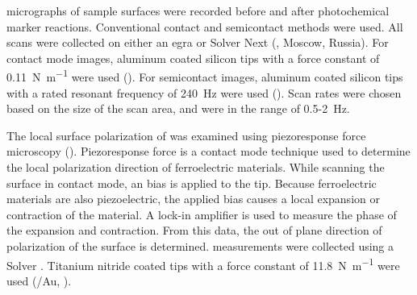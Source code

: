  micrographs of sample surfaces were recorded before and after photochemical
marker reactions. Conventional contact and semicontact methods were
used.\cite{Anonymous:YBI-TQ6H} All scans were collected on either an egra or
Solver Next  (, Moscow, Russia). For contact mode images, aluminum
coated silicon tips with a force constant of 0.11~\si{\newton\per\meter} were used
(). For semicontact images, aluminum coated silicon tips with a rated
resonant frequency of 240~\si{\hertz} were used (). Scan rates were
chosen based on the size of the scan area, and were in the range of 0.5-2~\si{\hertz}.  

The local surface polarization of  was examined using piezoresponse force
microscopy (). Piezoresponse force is a contact mode technique used to determine
the local polarization direction of ferroelectric
materials.\cite{Kalinin:2002hq,Kalinin:2006bg,Jungk:2006he,Rodriguez:2004bu} While
scanning the surface in contact mode, an  bias is applied to the tip. Because
ferroelectric materials are also piezoelectric, the applied bias causes a local expansion
or contraction of the material. A lock-in amplifier is used to measure the phase of the
expansion and contraction. From this data, the out of plane direction of polarization of
the surface is determined.  measurements were collected using a
Solver . Titanium nitride coated tips with a force constant of
11.8~\si{\newton\per\meter} were used (/Au, ).